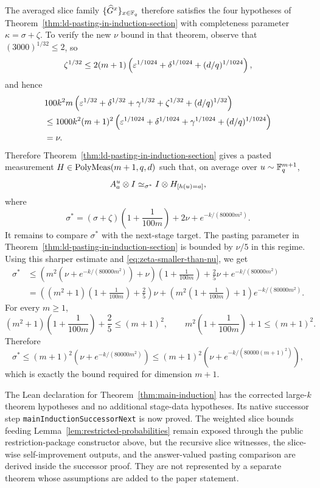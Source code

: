	The averaged slice family $\{\widehat G^x\}_{x \in \mathbb{F}_q}$ therefore satisfies the four hypotheses of Theorem~\ref{thm:ld-pasting-in-induction-section} with completeness parameter $\kappa=\sigma+\zeta$. To verify the new $\nu$ bound in that theorem, observe that $(3000)^{1/32} \le 2$, so
	\[
		\zeta^{1/32} \le 2(m+1)\left(\varepsilon^{1/1024}+\delta^{1/1024}+(d/q)^{1/1024}\right),
	\]
	and hence
	\begin{align*}
		 & 100k^2m\left(\varepsilon^{1/32}+\delta^{1/32}+\gamma^{1/32}+\zeta^{1/32}+(d/q)^{1/32}\right)       \\
		 & \le 1000k^2(m+1)^2\left(\varepsilon^{1/1024}+\delta^{1/1024}+\gamma^{1/1024}+(d/q)^{1/1024}\right) \\
		 & = \nu.
	\end{align*}
	Therefore Theorem~\ref{thm:ld-pasting-in-induction-section} gives a pasted measurement $H \in \mathrm{PolyMeas}(m+1,q,d)$ such that, on average over $u \sim \mathbb{F}_q^{m+1}$,
	\[
		A_a^u \otimes I \simeq_{\sigma^*} I \otimes H_{[h(u)=a]},
	\]
	where
	\[
		\sigma^* = (\sigma+\zeta)\left(1+\frac{1}{100m}\right) + 2\nu + e^{-k/(80000m^2)}.
	\]
	It remains to compare $\sigma^*$ with the next-stage target. The pasting
	parameter in Theorem~\ref{thm:ld-pasting-in-induction-section} is bounded by
	$\nu/5$ in this regime. Using this sharper estimate and
	\eqref{eq:zeta-smaller-than-nu}, we get
	\begin{align*}
		\sigma^*
		 & \le \left(m^2\left(\nu+e^{-k/(80000m^2)}\right)+\nu\right)
		      \left(1+\frac{1}{100m}\right) + \frac{2}{5}\nu
		      + e^{-k/(80000m^2)} \\
		 & = \left((m^2+1)\left(1+\frac{1}{100m}\right)+\frac{2}{5}\right)\nu
		     + \left(m^2\left(1+\frac{1}{100m}\right)+1\right)e^{-k/(80000m^2)}.
	\end{align*}
	For every $m\ge 1$,
	\[
		(m^2+1)\left(1+\frac{1}{100m}\right)+\frac{2}{5}\le (m+1)^2,
		\qquad
		m^2\left(1+\frac{1}{100m}\right)+1\le (m+1)^2.
	\]
	Therefore
	\[
		\sigma^* \le (m+1)^2\left(\nu+e^{-k/(80000m^2)}\right)
		\le (m+1)^2\left(\nu+e^{-k/(80000(m+1)^2)}\right),
	\]
	which is exactly the bound required for dimension $m+1$.

\begin{remark}\label{rem:main-induction-successor-assembly}
	The Lean declaration for
	Theorem~\ref{thm:main-induction} has the corrected
	large-\(k\) theorem hypotheses and no additional stage-data hypotheses.  Its
	native successor step \texttt{mainInductionSuccessorNext} is now proved.  The
	weighted slice bounds feeding Lemma~\ref{lem:restricted-probabilities} remain
	exposed through the public restriction-package constructor above, but the
	recursive slice witnesses, the slice-wise self-improvement outputs, and the
	answer-valued pasting comparison are derived inside the successor proof.  They
	are not represented by a separate theorem whose assumptions are added to the
	paper statement.
\end{remark}

